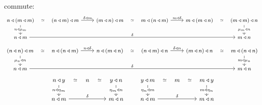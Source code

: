 \documentclass[
  11pt,
  oneside,
  article]{memoir}
\theoremstyle{definition}
\theoremstyle{plain}
\newcommand{\0}{\textsf{0}}
\newcommand{\1}{\tn{\textsf{1}}}
\begin{document}
commute: \[
\footnotesize \begin{tikzcd} 
    {n \triangleleft (m \triangleleft m)} & {(n \triangleleft m) \triangleleft m} & {(m \triangleleft n) \triangleleft m} & {m \triangleleft (n \triangleleft m)} & {m \triangleleft (m \triangleleft n)} & {(m \triangleleft m) \triangleleft n} \\
    {n \triangleleft m} &&&&& {m \triangleleft n}
    \arrow["\simeq"{description}, draw=none, from=1-1, to=1-2]
    \arrow["{n \triangleleft \mu_m}"{description}, from=1-1, to=2-1]
    \arrow["{\delta \triangleleft m}", from=1-2, to=1-3]
    \arrow["\simeq"{description}, draw=none, from=1-3, to=1-4]
    \arrow["{m \triangleleft \delta}", from=1-4, to=1-5]
    \arrow["\simeq"{description}, draw=none, from=1-5, to=1-6]
    \arrow["{\mu_m \triangleleft n}"{description}, from=1-6, to=2-6]
    \arrow["\delta", from=2-1, to=2-6]
\end{tikzcd}
\] \[
\footnotesize \begin{tikzcd}
    {(n \triangleleft n) \triangleleft m} & {n \triangleleft (n \triangleleft m)} & {n \triangleleft (m \triangleleft n)} & {(n \triangleleft m) \triangleleft n} & {(m \triangleleft n) \triangleleft n} & {m \triangleleft (n \triangleleft n)} \\
    {n \triangleleft m} &&&&& {m \triangleleft n}
    \arrow["\simeq"{description}, draw=none, from=1-1, to=1-2]
    \arrow["{\mu_n \triangleleft n}"{description}, from=1-1, to=2-1]
    \arrow["{n \triangleleft \delta}", from=1-2, to=1-3]
    \arrow["\simeq"{description}, draw=none, from=1-3, to=1-4]
    \arrow["{\delta \triangleleft n}", from=1-4, to=1-5]
    \arrow["\simeq"{description}, draw=none, from=1-5, to=1-6]
    \arrow["{m \triangleleft \mu_n}"{description}, from=1-6, to=2-6]
    \arrow["\delta", from=2-1, to=2-6]
\end{tikzcd}
\] \[
\footnotesize \begin{tikzcd}
    {n \triangleleft y} & n & {y \triangleleft n} \\
    {n \triangleleft m} && {m \triangleleft n}
    \arrow["\simeq"{description}, draw=none, from=1-1, to=1-2]
    \arrow["{n \triangleleft \eta_m}"{description}, from=1-1, to=2-1]
    \arrow["\simeq"{description}, draw=none, from=1-2, to=1-3]
    \arrow["{\eta_m \triangleleft n}"{description}, from=1-3, to=2-3]
    \arrow["\delta", from=2-1, to=2-3]
\end{tikzcd} \qquad \begin{tikzcd}
    {y \triangleleft m} & m & {m \triangleleft y} \\
    {n \triangleleft m} && {m \triangleleft n}
    \arrow["\simeq"{description}, draw=none, from=1-1, to=1-2]
    \arrow["{\eta_n \triangleleft m}"{description}, from=1-1, to=2-1]
    \arrow["\simeq"{description}, draw=none, from=1-2, to=1-3]
    \arrow["{m \triangleleft \eta_n}"{description}, from=1-3, to=2-3]
    \arrow["\delta", from=2-1, to=2-3]
\end{tikzcd}
\]
\end{document}
